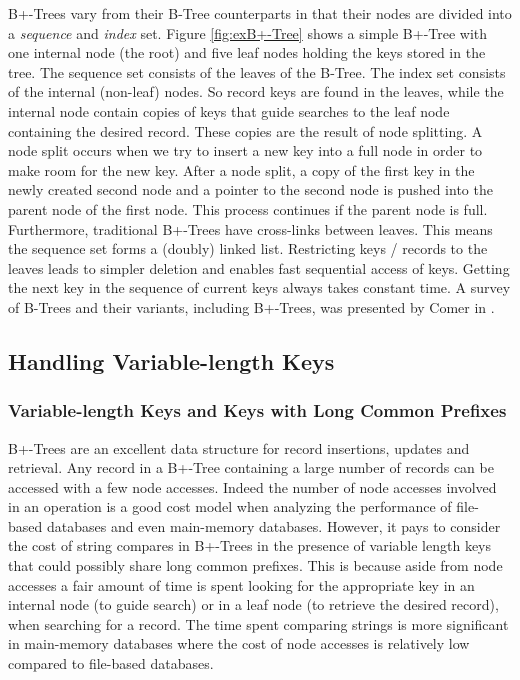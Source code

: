 B+-Trees vary from their B-Tree counterparts in that their nodes are divided into a \textit{sequence} and \textit{index} set. Figure \ref{fig:exB+-Tree} shows a simple B+-Tree with one internal node (the root) and five leaf nodes holding the keys stored in the tree. The sequence set consists of the leaves of the B-Tree. The index set consists of the internal (non-leaf) nodes. So record keys are found in the leaves, while the internal node contain copies of keys that guide searches to the leaf node containing the desired record. These copies are the result of node splitting. A node split occurs when we try to insert a new key into a full node in order to make room for the new key. After a node split, a copy of the first key in the newly created second node and a pointer to the second node is pushed into the parent node of the first node. This process continues if the parent node is full. Furthermore, traditional B+-Trees have cross-links between leaves. This means the sequence set forms a (doubly) linked list. Restricting keys / records to the leaves leads to simpler deletion and enables fast sequential access of keys. Getting the next key in the sequence of current keys always takes constant time. A survey of B-Trees and their variants, including B+-Trees, was presented by Comer in \cite{comer1979ubiquitous}. 

\subsection{Handling Variable-length Keys} \label{sec:VarLCPKeysMasstree}

\subsubsection{Variable-length Keys and Keys with Long Common Prefixes}

B+-Trees are an excellent data structure for record insertions, updates and retrieval. Any record in a B+-Tree containing a large number of records can be accessed with a few node accesses. Indeed the number of node accesses involved in an operation is a good cost model when analyzing the performance of file-based databases and even main-memory databases. However, it pays to consider the cost of string compares in B+-Trees in the presence of variable length keys that could possibly share long common prefixes. This is because aside from node accesses a fair amount of time is spent looking for the appropriate key in an internal node (to guide search) or in a leaf node (to retrieve the desired record), when searching for a record. The time spent comparing strings is more significant in main-memory databases where the cost of node accesses is relatively low compared to file-based databases.

